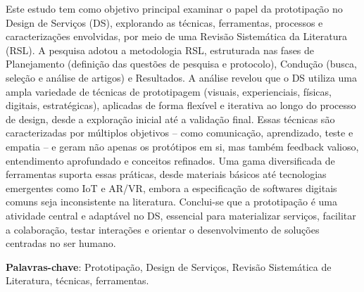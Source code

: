 \begin{resumo}

Este estudo tem como objetivo principal examinar o papel da prototipação no Design de Serviços (DS), explorando as técnicas, ferramentas, processos e caracterizações envolvidas, por meio de uma Revisão Sistemática da Literatura (RSL). A pesquisa adotou a metodologia RSL, estruturada nas fases de Planejamento (definição das questões de pesquisa e protocolo), Condução (busca, seleção e análise de artigos) e Resultados. A análise revelou que o DS utiliza uma ampla variedade de técnicas de prototipagem (visuais, experienciais, físicas, digitais, estratégicas), aplicadas de forma flexível e iterativa ao longo do processo de design, desde a exploração inicial até a validação final. Essas técnicas são caracterizadas por múltiplos objetivos – como comunicação, aprendizado, teste e empatia – e geram não apenas os protótipos em si, mas também feedback valioso, entendimento aprofundado e conceitos refinados. Uma gama diversificada de ferramentas suporta essas práticas, desde materiais básicos até tecnologias emergentes como IoT e AR/VR, embora a especificação de softwares digitais comuns seja inconsistente na literatura. Conclui-se que a prototipação é uma atividade central e adaptável no DS, essencial para materializar serviços, facilitar a colaboração, testar interações e orientar o desenvolvimento de soluções centradas no ser humano.

 \vspace{\onelineskip}
    
 \noindent
 \textbf{Palavras-chave}: Prototipação, Design de Serviços, Revisão Sistemática de Literatura, técnicas, ferramentas.
\end{resumo}

